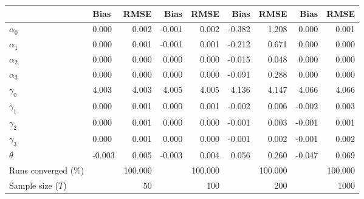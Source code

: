 
\begin{tabular}[t]{llrrrrrrr}
\toprule
  & Bias & RMSE & Bias & RMSE & Bias & RMSE & Bias & RMSE\\
\midrule
$\alpha_{0}$ & 0.000 & 0.002 & -0.001 & 0.002 & -0.382 & 1.208 & 0.000 & 0.001\\
$\alpha_{1}$ & 0.000 & 0.001 & -0.001 & 0.001 & -0.212 & 0.671 & 0.000 & 0.000\\
$\alpha_{2}$ & 0.000 & 0.000 & 0.000 & 0.000 & -0.015 & 0.048 & 0.000 & 0.000\\
$\alpha_{3}$ & 0.000 & 0.000 & 0.000 & 0.000 & -0.091 & 0.288 & 0.000 & 0.000\\
$\gamma_{0}$ & 4.003 & 4.003 & 4.005 & 4.005 & 4.136 & 4.147 & 4.066 & 4.066\\
$\gamma_{1}$ & 0.000 & 0.001 & 0.000 & 0.001 & -0.002 & 0.006 & -0.002 & 0.003\\
$\gamma_{2}$ & 0.000 & 0.001 & 0.000 & 0.000 & -0.001 & 0.003 & -0.001 & 0.001\\
$\gamma_{3}$ & 0.000 & 0.001 & 0.000 & 0.000 & -0.001 & 0.002 & -0.001 & 0.002\\
$\theta$ & -0.003 & 0.005 & -0.003 & 0.004 & 0.056 & 0.260 & -0.047 & 0.069\\
Runs converged (\%) &  & 100.000 &  & 100.000 &  & 100.000 &  & 100.000\\
Sample size ($T$) &  & 50 &  & 100 &  & 200 &  & 1000\\
\bottomrule
\end{tabular}
